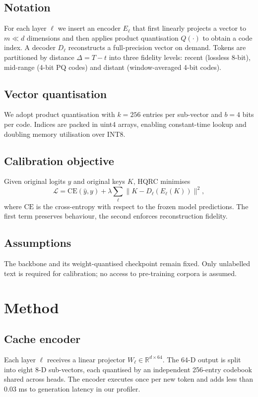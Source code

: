 \documentclass{article}
\begin{document}
\subsection{Notation}
For each layer \(\ell\) we insert an encoder \(E_\ell\) that first linearly projects a vector to \(m \ll d\) dimensions and then applies product quantisation \(Q(\cdot)\) to obtain a code index. A decoder \(D_\ell\) reconstructs a full-precision vector on demand. Tokens are partitioned by distance \(\Delta = T - t\) into three fidelity levels: recent (lossless 8-bit), mid-range (4-bit PQ codes) and distant (window-averaged 4-bit codes).

\subsection{Vector quantisation}
We adopt product quantisation with \(k = 256\) entries per sub-vector and \(b = 4\) bits per code. Indices are packed in uint4 arrays, enabling constant-time lookup and doubling memory utilisation over INT8.

\subsection{Calibration objective}
Given original logits \(\hat{y}\) and original keys \(K\), HQRC minimises
\[\mathcal{L} = \mathrm{CE}(\hat{y}, y) + \lambda \sum_\ell \lVert K - D_\ell(E_\ell(K)) \rVert^2,\]
where \(\mathrm{CE}\) is the cross-entropy with respect to the frozen model predictions. The first term preserves behaviour, the second enforces reconstruction fidelity.

\subsection{Assumptions}
The backbone and its weight-quantised checkpoint remain fixed. Only unlabelled text is required for calibration; no access to pre-training corpora is assumed.

\section{Method}
\subsection{Cache encoder}
Each layer \(\ell\) receives a linear projector \(W_\ell \in \mathbb{R}^{d\times 64}\). The 64-D output is split into eight 8-D sub-vectors, each quantised by an independent 256-entry codebook shared across heads. The encoder executes once per new token and adds less than \(0.03\) ms to generation latency in our profiler.
\end{document}
